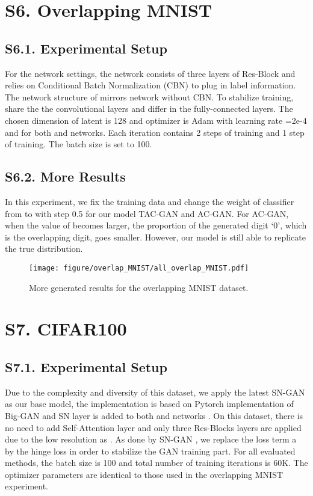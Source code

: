 \section*{S6. Overlapping MNIST}
\subsection*{S6.1. Experimental Setup}
For the network settings, the  network consists of three layers of Res-Block and relies on Conditional Batch Normalization (CBN) \cite{CBN} to plug in label information. The network structure of  mirrors  network without CBN. To stabilize training,  share the the convolutional layers and differ in the fully-connected layers. The chosen dimension of latent  is 128 and optimizer is Adam with learning rate =2e-4 and  for both  and  networks.  Each iteration contains 2 steps of  training and 1 step of  training. The batch size is set to 100.

\subsection*{S6.2. More Results}
In this experiment, we fix the training data and change the weight of classifier from  to  with step 0.5 for our model TAC-GAN and AC-GAN. For AC-GAN, when the value of  becomes larger, the proportion of the generated digit `0', which is the overlapping digit, goes smaller. However, our model is still able to replicate the true distribution.

\begin{figure}[h]
\texttt{[image: figure/overlap\_MNIST/all\_overlap\_MNIST.pdf]}
  \caption{More generated results for the overlapping MNIST dataset.}
  \label{all_MNIST}
\end{figure}

\section*{S7. CIFAR100 }
\subsection*{S7.1. Experimental Setup}
Due to the complexity and diversity of this dataset, we apply the latest SN-GAN \cite{miyato2018spectral} as our base model, the implementation is based on Pytorch implementation of Big-GAN \cite{brock2018large} and SN layer is added to both  and  networks \cite{Han18}. On this dataset, there is no need to add Self-Attention layer \cite{Han18} and only three Res-Blocks layers are applied due to the low resolution as . As done by SN-GAN \cite{miyato2018spectral}, we replace the loss term {\textcircled{\small a}} by the hinge loss in order to stabilize the GAN training part. For all evaluated methods, the batch size is 100 and total number of training iterations is 60K. The optimizer parameters are identical to those used in the overlapping MNIST experiment. 
